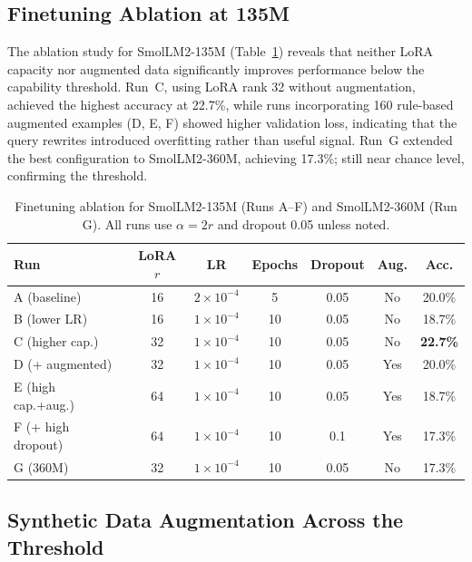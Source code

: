 \documentclass{article}
\begin{document}
\subsection{Finetuning Ablation at 135M}

The ablation study for SmolLM2-135M (Table~\ref{tab:ablation}) reveals that neither LoRA capacity nor augmented data significantly improves performance below the capability threshold. Run~C, using LoRA rank 32 without augmentation, achieved the highest accuracy at 22.7\%, while runs incorporating 160 rule-based augmented examples (D, E, F) showed higher validation loss, indicating that the query rewrites introduced overfitting rather than useful signal. Run~G extended the best configuration to SmolLM2-360M, achieving 17.3\%; still near chance level, confirming the threshold.

\begin{table}[h]
  \caption{Finetuning ablation for SmolLM2-135M (Runs A--F) and SmolLM2-360M (Run G). All runs use $\alpha = 2r$ and dropout 0.05 unless noted.}
  \label{tab:ablation}
  \centering
  \small
  \begin{tabular}{lcccccc}
    \toprule
    Run & LoRA $r$ & LR & Epochs & Dropout & Aug. & Acc. \\
    \midrule
    A (baseline) & 16 & $2{\times}10^{-4}$ & 5 & 0.05 & No & 20.0\% \\
    B (lower LR) & 16 & $1{\times}10^{-4}$ & 10 & 0.05 & No & 18.7\% \\
    C (higher cap.) & 32 & $1{\times}10^{-4}$ & 10 & 0.05 & No & \textbf{22.7\%} \\
    D (+ augmented) & 32 & $1{\times}10^{-4}$ & 10 & 0.05 & Yes & 20.0\% \\
    E (high cap.+aug.) & 64 & $1{\times}10^{-4}$ & 10 & 0.05 & Yes & 18.7\% \\
    F (+ high dropout) & 64 & $1{\times}10^{-4}$ & 10 & 0.1 & Yes & 17.3\% \\
    G (360M) & 32 & $1{\times}10^{-4}$ & 10 & 0.05 & No & 17.3\% \\
    \bottomrule
  \end{tabular}
\end{table}

\subsection{Synthetic Data Augmentation Across the Threshold}
\end{document}
